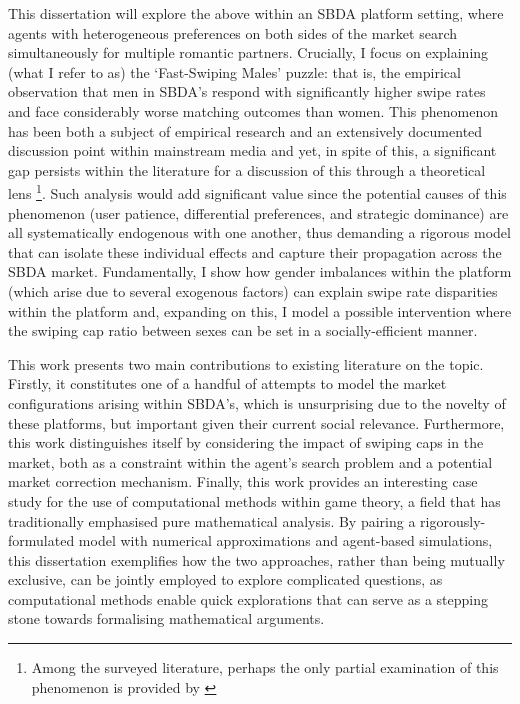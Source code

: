 This dissertation will explore the above within an SBDA platform setting, where agents with heterogeneous preferences on both sides of the market search simultaneously for multiple romantic partners.
Crucially, I focus on explaining (what I refer to as) the `Fast-Swiping Males' puzzle: that is, the empirical observation that men in SBDA's respond with significantly higher swipe rates and face considerably worse matching outcomes than women. This phenomenon has been both a subject of empirical research \citep{tyson2016first} and an extensively documented discussion point within mainstream media \citep{web:vice_tindermen, web:wp_miserabletinder} and yet, in spite of this, a significant gap persists within the literature for a discussion of this through a theoretical lens \footnote{Among the surveyed literature, perhaps the only partial examination of this phenomenon is provided by \cite{kanoria2021facilitating}}. 
Such analysis would add significant value since the potential causes of this phenomenon (user patience, differential preferences, and strategic dominance) are all systematically endogenous with one another, thus demanding a rigorous model that can isolate these individual effects and capture their propagation across the SBDA market.
Fundamentally, I show how gender imbalances within the platform (which arise due to several exogenous factors) can explain swipe rate disparities within the platform and, expanding on this, I model a possible intervention where the swiping cap ratio between sexes can be set in a socially-efficient manner.

This work presents two main contributions to existing literature on the topic. 
Firstly, it constitutes one of a handful of attempts to model the market configurations arising within SBDA's, which is unsurprising due to the novelty of these platforms, but important given their current social relevance. 
Furthermore, this work distinguishes itself by considering the impact of swiping caps in the market, both as a constraint within the agent's search problem and a potential market correction mechanism.
Finally, this work provides an interesting case study for the use of computational methods within game theory, a field that has traditionally emphasised pure mathematical analysis. 
By pairing a rigorously-formulated model with numerical approximations and agent-based simulations, this dissertation exemplifies how the two approaches, rather than being mutually exclusive, can be jointly employed to explore complicated questions, as computational methods enable quick explorations that can serve as a stepping stone towards formalising mathematical arguments.

